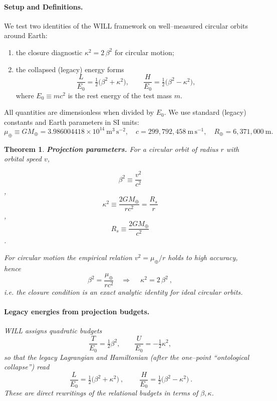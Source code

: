 \documentclass[12pt, a4paper]{article}
\newtheorem{theorem}{Theorem}[section]
\begin{document}
\paragraph{Setup and Definitions.}
We test two identities of the WILL framework on well–measured circular orbits around Earth:
\begin{enumerate}
    \item the closure diagnostic \(\kappa^2 = 2\,\beta^2\) for circular motion;
    \item the collapsed (legacy) energy forms
    \[
    \frac{L}{E_0} = \tfrac{1}{2}\bigl(\beta^2+\kappa^2\bigr),
    \qquad
    \frac{H}{E_0} = \tfrac{1}{2}\bigl(\beta^2-\kappa^2\bigr),
    \]
    where \(E_0 \equiv m c^2\) is the rest energy of the test mass \(m\).
\end{enumerate}
All quantities are dimensionless when divided by \(E_0\).
We use standard (legacy) constants and Earth parameters in SI units:
\[
\mu_\oplus \equiv GM_\oplus = 3.986004418\times10^{14}\ \mathrm{m^3\,s^{-2}},
\quad
c = 299{,}792{,}458\ \mathrm{m\,s^{-1}},
\quad
R_\oplus = 6{,}371{,}000\ \mathrm{m}.
\]
\begin{theorem}
\textbf{Projection parameters.}
For a circular orbit of radius \(r\) with orbital speed \(v\),

$$\beta^2 \equiv \frac{v^2}{c^2}$$, 
\qquad
$$\kappa^2 \equiv \frac{2GM_\oplus}{r c^2} = \frac{R_s}{r}$$,
\quad
$$R_s \equiv \frac{2GM_\oplus}{c^2}$$.

For circular motion the empirical relation \(v^2=\mu_\oplus/r\) holds to high accuracy, hence
\[
\beta^2 = \frac{\mu_\oplus}{r c^2}
\quad\Longrightarrow\quad
\boxed{\ \kappa^2 = 2\,\beta^2\ },
\]
i.e. the closure condition is an exact analytic identity for ideal circular orbits.

\paragraph{Legacy energies from projection budgets.}
WILL assigns quadratic budgets
\[
\frac{T}{E_0} = \tfrac{1}{2}\beta^2,
\qquad
\frac{U}{E_0} = -\tfrac{1}{2}\kappa^2,
\]
so that the legacy Lagrangian and Hamiltonian (after the one–point ``ontological collapse'') read
\[
\boxed{\ \frac{L}{E_0} = \tfrac{1}{2}\bigl(\beta^2+\kappa^2\bigr)\ },
\qquad
\boxed{\ \frac{H}{E_0} = \tfrac{1}{2}\bigl(\beta^2-\kappa^2\bigr)\ }.
\]
These are direct rewritings of the relational budgets in terms of \(\beta,\kappa\).
\end{theorem}
\end{document}
